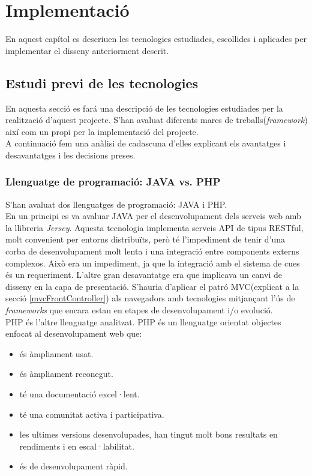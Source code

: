 \chapter{Implementaci\'{o}}
\label{cha:implementation}
En aquest capítol es descriuen les tecnologies estudiades, escollides i aplicades per implementar el disseny anteriorment descrit.\\


\section{Estudi previ de les tecnologies}
En aquesta secci\'{o} es far\'{a} una descripci\'{o} de les tecnologies estudiades per la realització d'aquest projecte. S'han avaluat diferents marcs de treballs(\textit{framework}) així com un propi per la implementació del projecte.\\

A continuació fem una anàlisi de cadascuna d'elles explicant els avantatges i desavantatges i les decisions preses.

\subsection{Llenguatge de programació: JAVA vs. PHP}
S'han avaluat dos llenguatges de programació: JAVA i PHP.\\

En un principi es va avaluar JAVA per el desenvolupament dels serveis web amb la llibreria \textit{Jersey}.\cite{jersey} Aquesta tecnologia implementa serveis API de tipus RESTful, molt convenient per entorns distribuïts, però t\'{e} l'impediment de tenir d'una corba de desenvolupament molt lenta i una integració entre components externs complexos. Això era un impediment, ja que la integració amb el sistema de cues \'{e}s un requeriment. L'altre gran desavantatge era que implicava un canvi de disseny en la capa de presentació. S'hauria d'aplicar el patró MVC(explicat a la secció \ref{mvcFrontController}) als navegadors amb tecnologies mitjançant l'\'{u}s de \textit{frameworks} que encara estan en etapes de desenvolupament i/o evolució.\\

PHP \'{e}s l'altre llenguatge analitzat. PHP \'{e}s un llenguatge orientat objectes enfocat al desenvolupament web que:
\begin{itemize}
\item \'{e}s àmpliament usat.
\item \'{e}s àmpliament reconegut.
\item t\'{e} una documentació excel·lent.
\item t\'{e} una comunitat activa i participativa.
\item les ultimes versions desenvolupades, han tingut molt bons resultats en rendiments i en escal·labilitat.
\item \'{e}s de desenvolupament ràpid.
\end{itemize}

